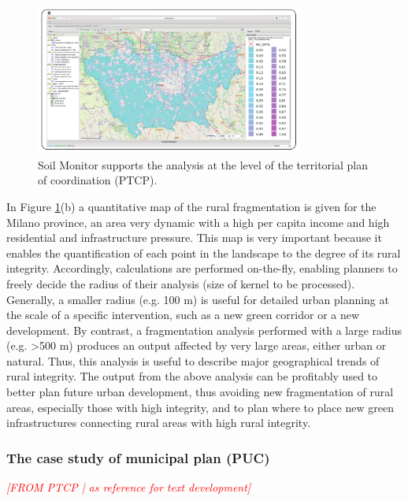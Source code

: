 \documentclass[APA,LATO1COL,doublespace]{WileyNJD-v2}
\newcommand{\toberevised}[1]{\emph{\textcolor{red}{#1}}} %
\begin{document}
\begin{figure}[t] %
    \centerline{\includegraphics[width=250pt]{daMileti/06_caso_provinciale.pdf}}
    \caption{ Soil Monitor supports the analysis at the level of the territorial plan of coordination (PTCP). } \label{fig:casePROV}
\end{figure}

In Figure \ref{fig:casePROV}(b) a quantitative map of the rural fragmentation is given for the Milano province, an area very dynamic with a high per capita income and high residential and infrastructure pressure. 
This map is very important because it enables the quantification of each point in the landscape to the degree of its rural integrity. 
Accordingly, calculations are performed on-the-fly, enabling planners to freely decide the radius of their analysis (size of kernel to be processed).
Generally, a smaller radius (e.g. 100 m) is useful for detailed urban planning at the scale of a specific intervention, such as a new green corridor or a new development.
By contrast, a fragmentation analysis performed with a large radius (e.g. >500 m) produces an output affected by very large areas, either urban or natural. 
Thus, this analysis is useful to describe major geographical trends of rural integrity.
The output from the above analysis can be profitably used to better plan future urban development, thus avoiding new fragmentation of rural areas, especially those with high integrity, and to plan where to place new green infrastructures connecting rural areas with high rural integrity.

\subsubsection{The case study of municipal plan (PUC)}
\toberevised{[FROM PTCP | as reference for text development]
}
\end{document}

